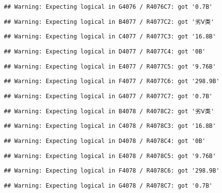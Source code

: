 \documentclass[
]{article}
\begin{document}
\begin{verbatim}
## Warning: Expecting logical in G4076 / R4076C7: got '0.7B'
\end{verbatim}

\begin{verbatim}
## Warning: Expecting logical in B4077 / R4077C2: got '劣Ⅴ类'
\end{verbatim}

\begin{verbatim}
## Warning: Expecting logical in C4077 / R4077C3: got '16.8B'
\end{verbatim}

\begin{verbatim}
## Warning: Expecting logical in D4077 / R4077C4: got '0B'
\end{verbatim}

\begin{verbatim}
## Warning: Expecting logical in E4077 / R4077C5: got '9.76B'
\end{verbatim}

\begin{verbatim}
## Warning: Expecting logical in F4077 / R4077C6: got '298.9B'
\end{verbatim}

\begin{verbatim}
## Warning: Expecting logical in G4077 / R4077C7: got '0.7B'
\end{verbatim}

\begin{verbatim}
## Warning: Expecting logical in B4078 / R4078C2: got '劣Ⅴ类'
\end{verbatim}

\begin{verbatim}
## Warning: Expecting logical in C4078 / R4078C3: got '16.8B'
\end{verbatim}

\begin{verbatim}
## Warning: Expecting logical in D4078 / R4078C4: got '0B'
\end{verbatim}

\begin{verbatim}
## Warning: Expecting logical in E4078 / R4078C5: got '9.76B'
\end{verbatim}

\begin{verbatim}
## Warning: Expecting logical in F4078 / R4078C6: got '298.9B'
\end{verbatim}

\begin{verbatim}
## Warning: Expecting logical in G4078 / R4078C7: got '0.7B'
\end{verbatim}
\end{document}
